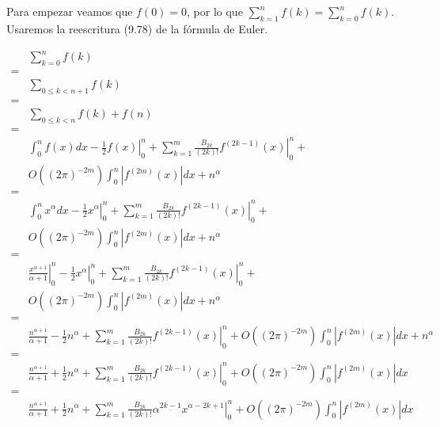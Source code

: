 \documentclass{article}
\begin{document}
\newpage
\section{}

Para empezar veamos que $f(0) = 0$, por lo que $\sum_{k=1}^n f(k) = \sum_{k=0}^n f(k)$.
Usaremos la reescritura (9.78) de la fórmula de Euler.

\begin{align*}
& \sum_{k=0}^n f(k) \\
= & \\
& \sum_{0 \leq k < n+1} f(k) \\
= & \\
& \sum_{0 \leq k < n} f(k) + f(n) \\
= & \\
& \int_0^n f(x)dx - \left. \frac{1}{2} f(x) \right|_0^n + \sum_{k=1}^m \frac{B_{2k}}{(2k)!} \left. f^{(2k-1)}(x) \right|_0^n + \\
& O((2\pi)^{-2m}) \int_0^n | f^{(2m)}(x) | dx + n^\alpha \\
= & \\
& \int_0^n x^\alpha dx - \left. \frac{1}{2} x^\alpha \right|_0^n + \sum_{k=1}^m \frac{B_{2k}}{(2k)!} \left. f^{(2k-1)}(x) \right|_0^n + \\
& O((2\pi)^{-2m}) \int_0^n | f^{(2m)}(x) | dx + n^\alpha \\
= & \\
& \left. \frac{x^{\alpha+1}}{\alpha+1} \right|_0^n
  - \left. \frac{1}{2} x^\alpha \right|_0^n + \sum_{k=1}^m \frac{B_{2k}}{(2k)!} \left. f^{(2k-1)}(x) \right|_0^n + \\
& O((2\pi)^{-2m}) \int_0^n | f^{(2m)}(x) | dx + n^\alpha \\
= & \\
& \frac{n^{\alpha+1}}{\alpha+1}
  - \frac{1}{2} n^\alpha + \sum_{k=1}^m \frac{B_{2k}}{(2k)!} \left. f^{(2k-1)}(x) \right|_0^n 
  + O((2\pi)^{-2m}) \int_0^n | f^{(2m)}(x) | dx + n^\alpha \\
= & \\
& \frac{n^{\alpha+1}}{\alpha+1}
  + \frac{1}{2} n^\alpha + \sum_{k=1}^m \frac{B_{2k}}{(2k)!} \left. f^{(2k-1)}(x) \right|_0^n 
  + O((2\pi)^{-2m}) \int_0^n | f^{(2m)}(x) | dx \\
= & \\
& \frac{n^{\alpha+1}}{\alpha+1}
  + \frac{1}{2} n^\alpha + \sum_{k=1}^m \frac{B_{2k}}{(2k)!} \left. \alpha^{\underline{2k-1}} x^{\alpha-2k+1} \right|_0^n +
  O((2\pi)^{-2m}) \int_0^n | f^{(2m)}(x) | dx \\
\end{align*}
\end{document}
